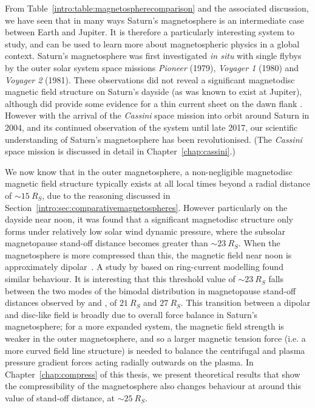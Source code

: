 From Table~\ref{intro:table:magnetospherecomparison} and the associated discussion, we have seen that in many ways Saturn's magnetosphere is an intermediate case between Earth and Jupiter. It is therefore a particularly interesting system to study, and can be used to learn more about magnetospheric physics in a global context. Saturn's magnetosphere was first investigated \textit{in situ} with single flybys by the outer solar system space missions \textit{Pioneer} (1979), \textit{Voyager 1} (1980) and \textit{Voyager 2} (1981). These observations did not reveal a significant magnetodisc magnetic field structure on Saturn's dayside (as was known to exist at Jupiter), although did provide some evidence for a thin current sheet on the dawn flank \citep{smith1980}. However with the arrival of the \textit{Cassini} space mission into orbit around Saturn in 2004, and its continued observation of the system until late 2017, our scientific understanding of Saturn's magnetosphere has been revolutionised. (The \textit{Cassini} space mission is discussed in detail in Chapter~\ref{chap:cassini}.)

We now know that in the outer magnetosphere, a non-negligible magnetodisc magnetic field structure typically exists at all local times beyond a radial distance of ${\sim}\SI{15}{R_S}$, due to the reasoning discussed in Section~\ref{intro:sec:comparativemagnetospheres}. However particularly on the dayside near noon, it was found that a significant magnetodisc structure only forms under relatively low solar wind dynamic pressure, where the subsolar magnetopause stand-off distance becomes greater than ${\sim}\SI{23}{R_S}$.  When the magnetosphere is more compressed than this, the magnetic field near noon is approximately dipolar~\citep{arridge2008}. A study by \citet{bunce2008} based on ring-current modelling found similar behaviour. It is interesting that this threshold value of ${\sim}\SI{23}{R_S}$ falls between the two modes of the bimodal distribution in magnetopause stand-off distances observed by \citet{achilleos2008} and \citet{pilkington2015}, of $\SI{21}{R_S}$ and $\SI{27}{R_S}$. This transition between a dipolar and disc-like field is broadly due to overall force balance in Saturn's magnetosphere; for a more expanded system, the magnetic field strength is weaker in the outer magnetosphere, and so a larger magnetic tension force (i.e. a more curved field line structure) is needed to balance the centrifugal and plasma pressure gradient forces acting radially outwards on the plasma. In Chapter~\ref{chap:compress} of this thesis, we present theoretical results that show the compressibility of the magnetosphere also changes behaviour at around this value of stand-off distance, at ${\sim}\SI{25}{R_S}$. 

